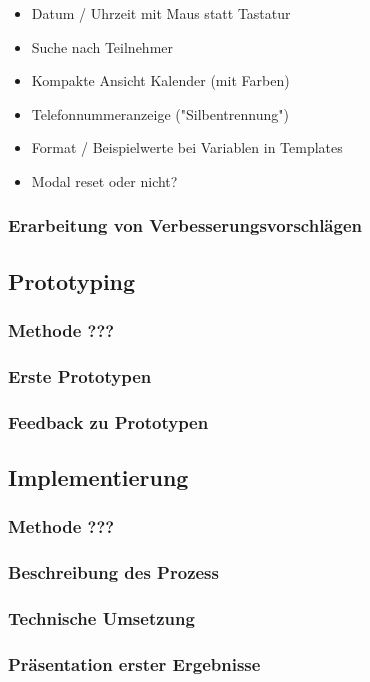 \documentclass[12pt]{article}
\begin{document}
\begin{itemize}
    \item Datum / Uhrzeit mit Maus statt Tastatur
    \item Suche nach Teilnehmer
    \item Kompakte Ansicht Kalender (mit Farben)
    \item Telefonnummeranzeige ("Silbentrennung")
    \item Format / Beispielwerte bei Variablen in Templates
    \item Modal reset oder nicht?
\end{itemize}

\subsubsection{Erarbeitung von Verbesserungsvorschlägen}

\subsection{Prototyping}
\subsubsection{Methode ???}
\subsubsection{Erste Prototypen}
\subsubsection{Feedback zu Prototypen}

\subsection{Implementierung}
\subsubsection{Methode ???}
\subsubsection{Beschreibung des Prozess}
\subsubsection{Technische Umsetzung}
\subsubsection{Präsentation erster Ergebnisse}
\end{document}
